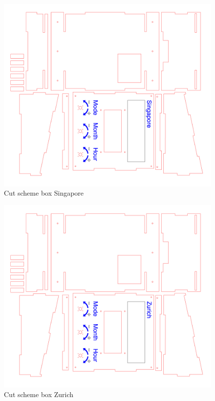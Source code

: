 \documentclass[a4paper,9pt]{article}
\begin{document}
\begin{landscape}
    \begin{figure}[H]
        \centering
        \includegraphics[width=.75\linewidth,trim={50 50 50 50}]{Images/singapore box.jpg}
        \caption{Cut scheme box Singapore}
    \end{figure}
      
    \begin{figure}[H]
         \centering
            \includegraphics[width=.75\linewidth,trim={50 50 50 50}]{Images/Zurich box.jpg}
        \caption{Cut scheme box Zurich}
    \end{figure}
\end{landscape}
\end{document}
